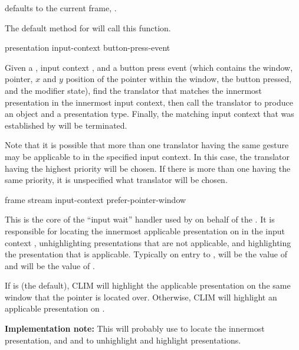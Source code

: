  defaults to the current frame, .

The default method for  will
call this function.


 {presentation input-context button-press-event}

Given a  , input context
, and a button press event (which contains the window,
pointer, $x$ and $y$ position of the pointer within the window, the button
pressed, and the modifier state), find the translator that matches the innermost
presentation in the innermost input context, then call the translator to produce
an object and a presentation type.  Finally, the matching input context that was
established by  will be terminated.

Note that it is possible that more than one translator having the same gesture
may be applicable to  in the specified input context.  In this
case, the translator having the highest priority will be chosen.  If there is
more than one having the same priority, it is unspecified what translator will
be chosen.


 {frame stream input-context
                                            \optional prefer-pointer-window}

This is the core of the ``input wait'' handler used by 
on behalf of the  .  It is responsible for
locating the innermost applicable presentation on  in the input
context , unhighlighting presentations that are not
applicable, and highlighting the presentation that is applicable.  Typically on
entry to ,  will be the
value of  and  will be the value of
.

If  is  (the default), CLIM will highlight
the applicable presentation on the same window that the pointer is located over.
Otherwise, CLIM will highlight an applicable presentation on .

{\bf Implementation note:} This will probably use
 to locate the
innermost presentation, and  and
 to unhighlight and highlight presentations.


